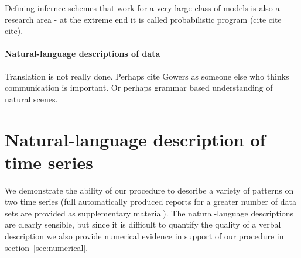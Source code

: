 \documentclass{article}
\begin{document}
Defining infernce schemes that work for a very large class of models is also a research area - at the extreme end it is called probabilistic program (cite cite cite).

\paragraph{Natural-language descriptions of data}

Translation is not really done.
Perhaps cite Gowers as someone else who thinks communication is important.
Or perhaps grammar based understanding of natural scenes.

\section{Natural-language description of time series}
\label{sec:examples}

We demonstrate the ability of our procedure to describe a variety of patterns on two time series (full automatically produced reports for a greater number of data sets are provided as supplementary material).
The natural-language descriptions are clearly sensible, but since it is difficult to quantify the quality of a verbal description we also provide numerical evidence in support of our procedure in section~\ref{sec:numerical}.
\end{document}
